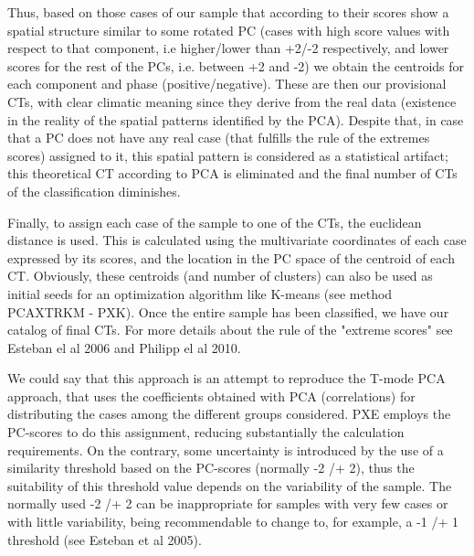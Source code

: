 \documentclass[12pt, oneside, a4paper, headsepline, plainheadsepline]{scrbook}
\begin{document}
Thus, based on those cases of our sample that according to their scores show a spatial structure similar to some rotated PC (cases with high score values with respect to that component, i.e higher/lower than +2/-2 respectively, and lower scores for the rest of the PCs, i.e. between +2 and -2) we obtain the centroids for each component and phase (positive/negative). These are then our provisional CTs, with clear climatic meaning since they derive from the real data (existence in the reality of the spatial patterns identified by the PCA). Despite that, in case that a PC does not have any real case (that fulfills the rule of the extremes scores) assigned to it, this spatial pattern is considered as a statistical artifact; this theoretical CT according to PCA is eliminated and the final number of CTs of the classification diminishes. 

Finally, to assign each case of the sample to one of the CTs, the euclidean distance is used. This is calculated using the multivariate coordinates of each case expressed by its scores, and the location in the PC space of the centroid of each CT. Obviously, these centroids (and number of clusters) can also be used as initial seeds for an optimization algorithm like K-means (see method PCAXTRKM - PXK). Once the entire sample has been classified, we have our catalog of final CTs. For more details about the rule of the "extreme scores" see Esteban el al 2006 and Philipp el al 2010. 

We could say that this approach is an attempt to reproduce the T-mode PCA approach, that uses the coefficients obtained with PCA (correlations) for distributing the cases among the different groups considered. PXE employs the PC-scores to do this assignment, reducing substantially the calculation requirements. On the contrary, some uncertainty is introduced by the use of a similarity threshold based on the PC-scores (normally -2 /+ 2), thus the suitability of this threshold value depends on the variability of the sample. The normally used  -2 /+ 2 can be inappropriate for samples with very few cases or with little variability, being recommendable to change to, for example, a -1 /+ 1 threshold (see Esteban et al 2005). 
\end{document}
